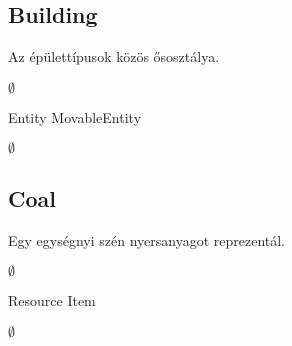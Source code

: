 \documentclass[../../projlab]{subfiles}
\begin{document}
\subsection{Building}
\begin{class-template-responsibility}
Az épülettípusok közös ősosztálya. 
\end{class-template-responsibility}
\begin{class-template-interface}
$\emptyset$
\end{class-template-interface}
\begin{class-template-baseclass}
Entity \baseclass MovableEntity
\end{class-template-baseclass}
\begin{class-template-attribute}
\item[] $\emptyset$
\end{class-template-attribute}
\begin{class-template-method}
\end{class-template-method}

\subsection{Coal}
\begin{class-template-responsibility}
 Egy egységnyi szén nyersanyagot reprezentál.
\end{class-template-responsibility}
\begin{class-template-interface}
$\emptyset$
\end{class-template-interface}
\begin{class-template-baseclass}
Resource \baseclass Item
\end{class-template-baseclass}
\begin{class-template-attribute}
\item[] $\emptyset$
\end{class-template-attribute}
\begin{class-template-method}
\end{class-template-method}
\end{document}
